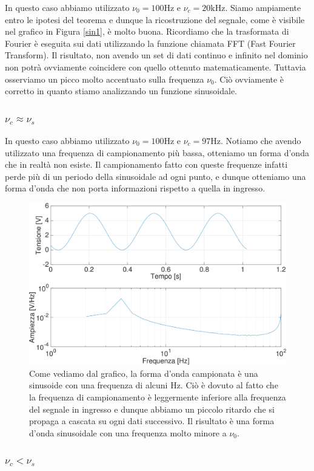 In questo caso abbiamo utilizzato $\nu_0=100 \si{\hertz}$ e $\nu_c=20 \si{\kilo\hertz}$. Siamo ampiamente entro le ipotesi del teorema e dunque la ricostruzione del segnale, come è visibile nel grafico in Figura \ref{sin1}, è molto buona.
Ricordiamo che la trasformata di Fourier è eseguita sui dati utilizzando la funzione chiamata FFT (Fast Fourier Transform).
Il risultato, non avendo un set di dati continuo e infinito nel dominio non potrà ovviamente coincidere con quello ottenuto matematicamente.
Tuttavia osserviamo un picco molto accentuato sulla frequenza $\nu_0$.
Ciò ovviamente è corretto in quanto stiamo analizzando un funzione sinusoidale.

\subsubsection{ $\nu_c \approx \nu_s$}
In questo caso abbiamo utilizzato $\nu_0=100 \si{\hertz}$ e $\nu_c=97 \si{\hertz}$. Notiamo che avendo utilizzato una frequenza di campionamento più bassa, otteniamo un forma d'onda che in realtà non esiste. Il campionamento fatto con queste frequenze infatti perde più di un periodo della sinusoidale ad ogni punto, e dunque otteniamo una forma d'onda che non porta informazioni rispetto a quella in ingresso.

\begin{figure}[H]
\centering
	\includegraphics[width=.65\textwidth]{../E13/latex/sin100hz@100,97_crop.pdf}
	\caption{Come vediamo dal grafico, la forma d'onda campionata è una sinusoide con una frequenza di alcuni Hz. Ciò è dovuto al fatto che la frequenza di campionamento è leggermente inferiore alla frequenza del segnale in ingresso e dunque abbiamo un piccolo ritardo che si propaga a cascata su ogni dati successivo. Il risultato è una forma d'onda sinusoidale con una frequenza molto minore a $\nu_0$.}
	\label{sin3}
\end{figure}

\subsubsection{ $\nu_c < \nu_s$}

